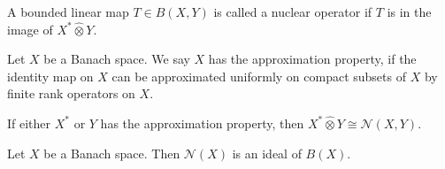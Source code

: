 

\begin{definition}
  A bounded linear map $T \in B(X, Y)$ is called a nuclear operator
  if $T$ is in the image of $ X^* \hat{\otimes} Y$.
\end{definition}

\begin{definition}
  Let $X$ be a Banach space. We say $X$ has the approximation
  property, if the identity map on $X$ can be approximated uniformly
  on compact subsets of $X$ by finite rank operators on $X$.
\end{definition}

\begin{theorem}
  If either $X^*$ or $Y$ has the approximation property, then $X^*
  \hat{\otimes} Y \cong \mathcal{N}(X, Y)$.
\end{theorem}

\begin{lemma}
  Let $X$ be a Banach space. Then $\mathcal{N}(X)$ is an ideal of $B(X)$.
\end{lemma}
